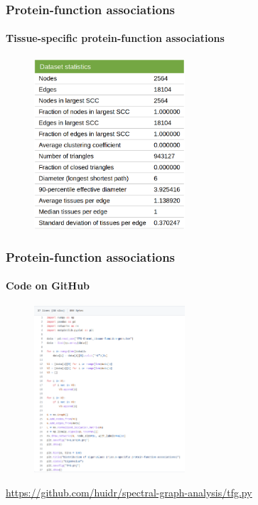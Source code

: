 \documentclass[aspectratio=43,leqno]{beamer}
\begin{document}
\begin{frame}
  \frametitle{Protein-function associations}
  \framesubtitle{Tissue-specific protein-function associations}

    \begin{figure}[h]
    \centering
    \includegraphics[width=0.5\textwidth]{images/tfg.png}
    \label{fig:mesh1}
  \end{figure}
  
\end{frame}

\begin{frame}
  \frametitle{Protein-function associations}
  \framesubtitle{Code on GitHub}

 \begin{figure}[h]
    \centering
    \includegraphics[width=0.5\textwidth]{images/tfg-code.png}
    \label{fig:mesh1}
  \end{figure}
  \hyperref{https://github.com/huidr/spectral-graph-analysis/tfg.py}{}{}{https://github.com/huidr/spectral-graph-analysis/tfg.py}
  
\end{frame}
\end{document}

